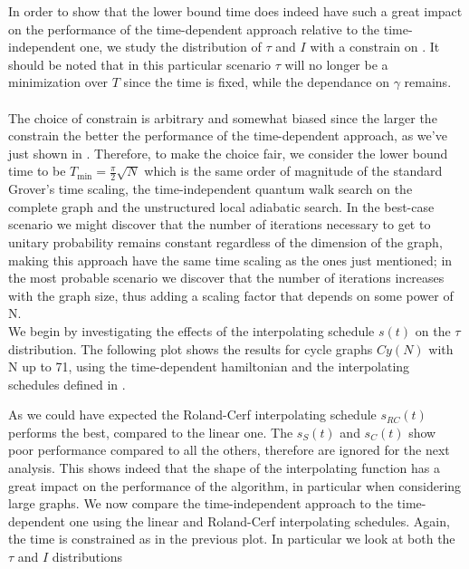         In order to show that the lower bound time does indeed have such a great impact on the performance of the time-dependent approach relative to the time-independent one, we study the distribution of $\tau$ and $I$ with a constrain on \tmin. It should be noted that in this particular scenario $\tau$ will no longer be a minimization over $T$ since the time is fixed, while the dependance on $\gamma$ remains. \\ \\ The choice of constrain is arbitrary and somewhat biased since the larger the constrain the better the performance of the time-dependent approach, as we've just shown in . Therefore, to make the choice fair, we consider the lower bound time to be $T_{\min} = \frac{\pi}{2}\sqrt{N}$ which is the same order of magnitude of the standard Grover's time scaling, the time-independent quantum walk search on the complete graph and the unstructured local adiabatic search. In the best-case scenario we might discover that the number of iterations necessary to get to unitary probability remains constant regardless of the dimension of the graph, making this approach have the same time scaling as the ones just mentioned; in the most probable scenario we discover that the number of iterations increases with the graph size, thus adding a scaling factor that depends on some power of N. \\

        \noindent
        We begin by investigating the effects of the interpolating schedule $s(t)$ on the $\tau$ distribution. The following plot shows the results for cycle graphs $Cy(N)$ with N up to 71, using the time-dependent hamiltonian and the interpolating schedules defined in .\\

        As we could have expected the Roland-Cerf interpolating schedule $s_{RC}(t)$ performs the best, compared to the linear one. The $s_S(t)$ and $s_C(t)$ show poor performance compared to all the others, therefore are ignored for the next analysis.  This shows indeed that the shape of the interpolating function has a great impact on the performance of the algorithm, in particular when considering large graphs. We now compare the time-independent approach to the time-dependent one using the linear and Roland-Cerf interpolating schedules. Again, the time is constrained as in the previous plot. In particular we look at both the $\tau$ and $I$ distributions \\

